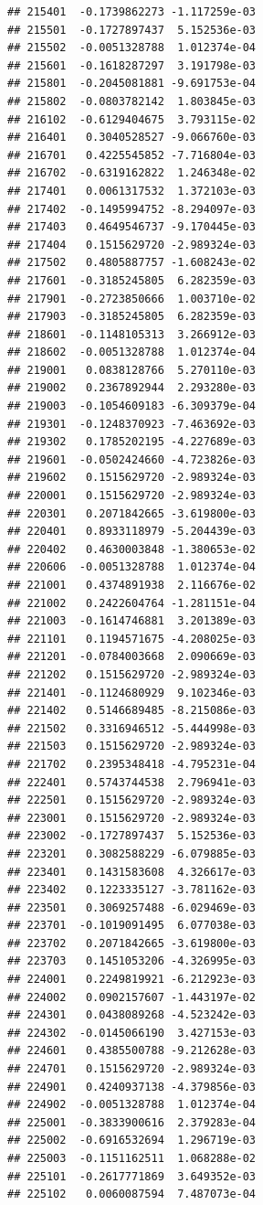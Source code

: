 \begin{frame}[fragile]
\begin{verbatim}
## 215401  -0.1739862273 -1.117259e-03
## 215501  -0.1727897437  5.152536e-03
## 215502  -0.0051328788  1.012374e-04
## 215601  -0.1618287297  3.191798e-03
## 215801  -0.2045081881 -9.691753e-04
## 215802  -0.0803782142  1.803845e-03
## 216102  -0.6129404675  3.793115e-02
## 216401   0.3040528527 -9.066760e-03
## 216701   0.4225545852 -7.716804e-03
## 216702  -0.6319162822  1.246348e-02
## 217401   0.0061317532  1.372103e-03
## 217402  -0.1495994752 -8.294097e-03
## 217403   0.4649546737 -9.170445e-03
## 217404   0.1515629720 -2.989324e-03
## 217502   0.4805887757 -1.608243e-02
## 217601  -0.3185245805  6.282359e-03
## 217901  -0.2723850666  1.003710e-02
## 217903  -0.3185245805  6.282359e-03
## 218601  -0.1148105313  3.266912e-03
## 218602  -0.0051328788  1.012374e-04
## 219001   0.0838128766  5.270110e-03
## 219002   0.2367892944  2.293280e-03
## 219003  -0.1054609183 -6.309379e-04
## 219301  -0.1248370923 -7.463692e-03
## 219302   0.1785202195 -4.227689e-03
## 219601  -0.0502424660 -4.723826e-03
## 219602   0.1515629720 -2.989324e-03
## 220001   0.1515629720 -2.989324e-03
## 220301   0.2071842665 -3.619800e-03
## 220401   0.8933118979 -5.204439e-03
## 220402   0.4630003848 -1.380653e-02
## 220606  -0.0051328788  1.012374e-04
## 221001   0.4374891938  2.116676e-02
## 221002   0.2422604764 -1.281151e-04
## 221003  -0.1614746881  3.201389e-03
## 221101   0.1194571675 -4.208025e-03
## 221201  -0.0784003668  2.090669e-03
## 221202   0.1515629720 -2.989324e-03
## 221401  -0.1124680929  9.102346e-03
## 221402   0.5146689485 -8.215086e-03
## 221502   0.3316946512 -5.444998e-03
## 221503   0.1515629720 -2.989324e-03
## 221702   0.2395348418 -4.795231e-04
## 222401   0.5743744538  2.796941e-03
## 222501   0.1515629720 -2.989324e-03
## 223001   0.1515629720 -2.989324e-03
## 223002  -0.1727897437  5.152536e-03
## 223201   0.3082588229 -6.079885e-03
## 223401   0.1431583608  4.326617e-03
## 223402   0.1223335127 -3.781162e-03
## 223501   0.3069257488 -6.029469e-03
## 223701  -0.1019091495  6.077038e-03
## 223702   0.2071842665 -3.619800e-03
## 223703   0.1451053206 -4.326995e-03
## 224001   0.2249819921 -6.212923e-03
## 224002   0.0902157607 -1.443197e-02
## 224301   0.0438089268 -4.523242e-03
## 224302  -0.0145066190  3.427153e-03
## 224601   0.4385500788 -9.212628e-03
## 224701   0.1515629720 -2.989324e-03
## 224901   0.4240937138 -4.379856e-03
## 224902  -0.0051328788  1.012374e-04
## 225001  -0.3833900616  2.379283e-04
## 225002  -0.6916532694  1.296719e-03
## 225003  -0.1151162511  1.068288e-02
## 225101  -0.2617771869  3.649352e-03
## 225102   0.0060087594  7.487073e-04

\end{verbatim}
\end{frame}
